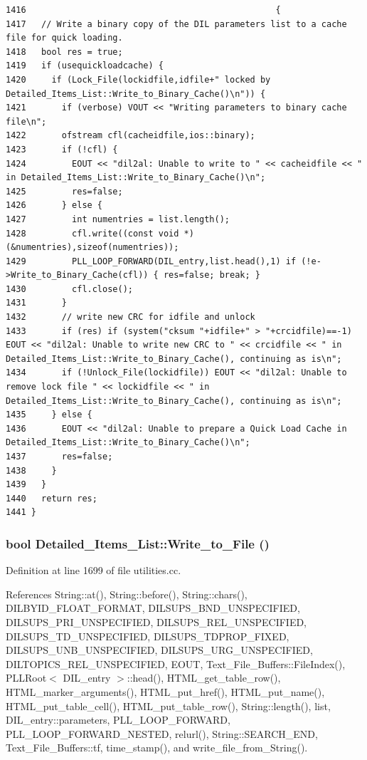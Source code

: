 \footnotesize\begin{verbatim}1416                                                 {
1417   // Write a binary copy of the DIL parameters list to a cache file for quick loading.
1418   bool res = true;
1419   if (usequickloadcache) {
1420     if (Lock_File(lockidfile,idfile+" locked by Detailed_Items_List::Write_to_Binary_Cache()\n")) {
1421       if (verbose) VOUT << "Writing parameters to binary cache file\n";
1422       ofstream cfl(cacheidfile,ios::binary);
1423       if (!cfl) {
1424         EOUT << "dil2al: Unable to write to " << cacheidfile << " in Detailed_Items_List::Write_to_Binary_Cache()\n";
1425         res=false;
1426       } else {
1427         int numentries = list.length();
1428         cfl.write((const void *) (&numentries),sizeof(numentries));
1429         PLL_LOOP_FORWARD(DIL_entry,list.head(),1) if (!e->Write_to_Binary_Cache(cfl)) { res=false; break; }
1430         cfl.close();
1431       }
1432       // write new CRC for idfile and unlock
1433       if (res) if (system("cksum "+idfile+" > "+crcidfile)==-1)  EOUT << "dil2al: Unable to write new CRC to " << crcidfile << " in Detailed_Items_List::Write_to_Binary_Cache(), continuing as is\n";
1434       if (!Unlock_File(lockidfile)) EOUT << "dil2al: Unable to remove lock file " << lockidfile << " in Detailed_Items_List::Write_to_Binary_Cache(), continuing as is\n";
1435     } else {
1436       EOUT << "dil2al: Unable to prepare a Quick Load Cache in Detailed_Items_List::Write_to_Binary_Cache()\n";
1437       res=false;
1438     }
1439   }
1440   return res;
1441 }
\end{verbatim}\normalsize 
{}
\subsubsection{\setlength{\rightskip}{0pt plus 5cm}bool Detailed\_\-Items\_\-List::Write\_\-to\_\-File ()}\label{classDetailed__Items__List_a5}




Definition at line 1699 of file utilities.cc.

References String::at(), String::before(), String::chars(), DILBYID\_\-FLOAT\_\-FORMAT, DILSUPS\_\-BND\_\-UNSPECIFIED, DILSUPS\_\-PRI\_\-UNSPECIFIED, DILSUPS\_\-REL\_\-UNSPECIFIED, DILSUPS\_\-TD\_\-UNSPECIFIED, DILSUPS\_\-TDPROP\_\-FIXED, DILSUPS\_\-UNB\_\-UNSPECIFIED, DILSUPS\_\-URG\_\-UNSPECIFIED, DILTOPICS\_\-REL\_\-UNSPECIFIED, EOUT, Text\_\-File\_\-Buffers::File\-Index(), PLLRoot$<$ DIL\_\-entry $>$::head(), HTML\_\-get\_\-table\_\-row(), HTML\_\-marker\_\-arguments(), HTML\_\-put\_\-href(), HTML\_\-put\_\-name(), HTML\_\-put\_\-table\_\-cell(), HTML\_\-put\_\-table\_\-row(), String::length(), list, DIL\_\-entry::parameters, PLL\_\-LOOP\_\-FORWARD, PLL\_\-LOOP\_\-FORWARD\_\-NESTED, relurl(), String::SEARCH\_\-END, Text\_\-File\_\-Buffers::tf, time\_\-stamp(), and write\_\-file\_\-from\_\-String().

